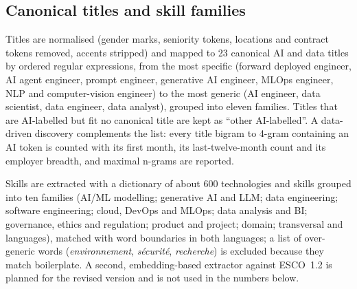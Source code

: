 \documentclass[5p,times,twocolumn,authoryear]{elsarticle}
\begin{document}
\subsection{Canonical titles and skill families}\label{sec:titles}
Titles are normalised (gender marks, seniority tokens, locations and contract tokens removed, accents stripped) and mapped to 23 canonical AI and data titles by ordered regular expressions, from the most specific (forward deployed engineer, AI agent engineer, prompt engineer, generative AI engineer, MLOps engineer, NLP and computer-vision engineer) to the most generic (AI engineer, data scientist, data engineer, data analyst), grouped into eleven families. Titles that are AI-labelled but fit no canonical title are kept as ``other AI-labelled''. A data-driven discovery complements the list: every title bigram to 4-gram containing an AI token is counted with its first month, its last-twelve-month count and its employer breadth, and maximal n-grams are reported.

Skills are extracted with a dictionary of about 600 technologies and skills grouped into ten families (AI/ML modelling; generative AI and LLM; data engineering; software engineering; cloud, DevOps and MLOps; data analysis and BI; governance, ethics and regulation; product and project; domain; transversal and languages), matched with word boundaries in both languages; a list of over-generic words (\emph{environnement}, \emph{sécurité}, \emph{recherche}) is excluded because they match boilerplate. A second, embedding-based extractor against ESCO~1.2 \citep{esco2024} is planned for the revised version and is not used in the numbers below.
\end{document}
